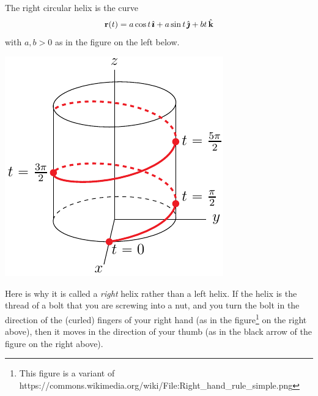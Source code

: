 \begin{eg}\label{eg:helixTwist}
The right circular helix is the curve
\begin{align*}
\mathbf{r}(t)= a\cos t\,\hat{\pmb{\imath}} +a\sin t\,\hat{\pmb{\jmath}} + bt\,\hat{\mathbf{k}}
\end{align*}
with $a,b>0$ as in the figure on the left below. 
\begin{efig}
\begin{center}
    \includegraphics{helix5.pdf} \qquad
\end{center}
\end{efig}
Here is why it is called a \emph{right} helix 
rather than a left helix. If the helix is the thread of a bolt that you 
are screwing into a nut, and you turn the bolt in the direction of the 
(curled) fingers of your right hand 
(as in the figure\footnote{This figure is a variant of 
https:/\hskip-1pt/commons.wikimedia.org/wiki/File:Right\_hand\_rule\_simple.png
} on the right above), 
then it moves in the direction of your thumb (as 
in the black arrow of the figure on the right above). 


\end{eg}
